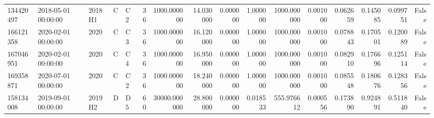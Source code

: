 \begin{tabular}{lllllrrrrrrrrrrr}
134420497 & 2018-05-01 00:00:00 & 2018H1 & C & C2 & 36 & 1000.000000 & 14.030000 & 0.000000 & 1.000000 & 1000.000000 & 0.001000 & 0.062659 & 0.145085 & 0.099751 & False \\
166121358 & 2020-02-01 00:00:00 & 2020 & C & C3 & 36 & 1000.000000 & 16.120000 & 0.000000 & 1.000000 & 1000.000000 & 0.001000 & 0.078843 & 0.170501 & 0.120089 & False \\
167046951 & 2020-02-01 00:00:00 & 2020 & C & C4 & 36 & 1000.000000 & 16.950000 & 0.000000 & 1.000000 & 1000.000000 & 0.001000 & 0.082910 & 0.176696 & 0.125114 & False \\
169358871 & 2020-07-01 00:00:00 & 2020 & C & C2 & 36 & 1000.000000 & 18.240000 & 0.000000 & 1.000000 & 1000.000000 & 0.001000 & 0.085548 & 0.180676 & 0.128356 & False \\
158134008 & 2019-09-01 00:00:00 & 2019H2 & D & D5 & 60 & 30000.000000 & 28.800000 & 0.000000 & 0.018533 & 555.976612 & 0.000556 & 0.173890 & 0.924891 & 0.511840 & False \\
\bottomrule
\end{tabular}
